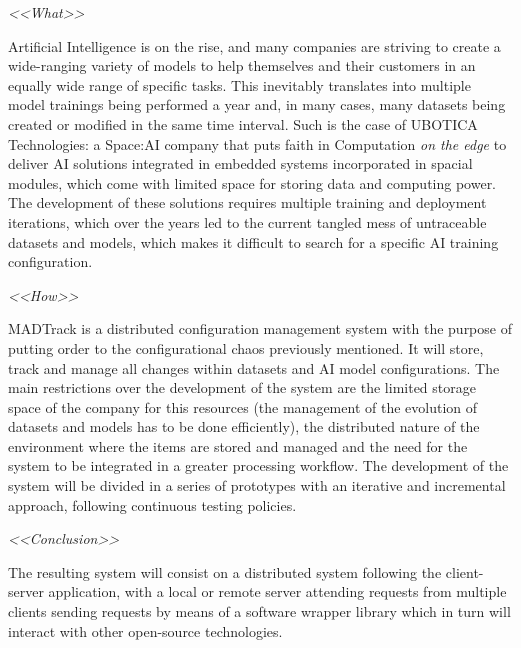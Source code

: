 \pagestyle{plain}	%



\begin{resumenAlt}[english]{\tituloCortoAlt} 

\emph{<<What>>}

Artificial Intelligence is on the rise, and many companies are striving to create a wide-ranging variety of models to help themselves and their customers in an equally wide range of specific tasks. This inevitably translates into multiple model trainings being performed a year and, in many cases, many datasets being created or modified in the same time interval. 
Such is the case of UBOTICA Technologies: a Space:AI company that puts faith in Computation \emph{on the edge} to deliver AI solutions integrated in embedded systems incorporated in spacial modules, which come with limited space for storing data and computing power. The development of these solutions requires multiple training and deployment iterations,
which over the years led to the current tangled mess of untraceable datasets and models, which makes it difficult to search for a specific AI training configuration. 


\emph{<<How>>}

MADTrack is a distributed configuration management system with the purpose of putting order to the configurational chaos previously mentioned. It will store, track and manage all changes within datasets and AI model configurations. The main 
restrictions over the development of the system are the limited storage space of the company for this resources (the management of the evolution of datasets and models has to be done efficiently), the distributed nature of the environment where the items 
are stored and managed and the need for the system to be integrated in a greater processing workflow. The development of the system will be divided in a series of prototypes with an iterative and incremental approach, following continuous testing policies.



\emph{<<Conclusion>>}

The resulting system will consist on a distributed system following the client-server application, with a local or remote server attending requests from multiple clients sending requests by means of a software wrapper library which in turn will interact with other open-source technologies.

\end{resumenAlt}

